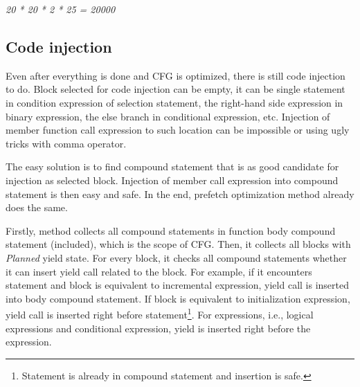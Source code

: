 \begin{center}
\emph{20 * 20 * 2 * 25 = 20000}
\end{center}

\subsection{Code injection}
Even after everything is done and CFG is optimized, there is still code injection to do. Block selected for code injection can be empty, it can be single statement in condition expression of selection statement, the right-hand side expression in binary expression, the else branch in conditional expression, etc. Injection of member function call expression to such location can be impossible or using ugly tricks with comma operator.

The easy solution is to find compound statement that is as good candidate for injection as selected block. Injection of member call expression into compound statement is then easy and safe. In the end, prefetch optimization method already does the same.

Firstly, method collects all compound statements in function body compound statement (included), which is the scope of CFG. Then, it collects all blocks with \emph{Planned} yield state. For every block, it checks all compound statements whether it can insert yield call related to the block. For example, if it encounters  statement and block is equivalent to incremental expression, yield call is inserted into body compound statement. If block is equivalent to initialization expression, yield call is inserted right before  statement\footnote{Statement is already in compound statement and insertion is safe.}. For expressions, i.e., logical expressions and conditional expression, yield is inserted right before the expression.

